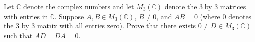 Let $\mathbb{C}$ denote the complex numbers and let $M_3 (\mathbb{C})$ denote
the 3 by 3 matrices with entries in $\mathbb{C}$. Suppose $A, B \in M_3
(\mathbb{C})$, $B \neq 0$, and $AB = 0$ (where $0$ denotes the 3 by 3 matrix with
all entries zero). Prove that there exists $0 \neq D \in M_3 (\mathbb{C})$ such
that $AD = DA = 0$.
